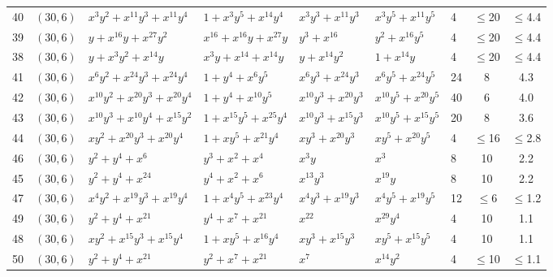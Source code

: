 \begin{table}[t]
\begin{tabular*}{\textwidth}{@{\extracolsep{\fill}}cllllllcc}
40 & $(30,6)$ & $x^{3}y^{2}{+}x^{11}y^{3}{+}x^{11}y^{4}$ & $1{+}x^{3}y^{5}{+}x^{14}y^{4}$ & $x^{3}y^{3}{+}x^{11}y^{3}$ & $x^{3}y^{5}{+}x^{11}y^{5}$ & 4 & $\leq$20 & $\leq$4.4 \\
39 & $(30,6)$ & $y{+}x^{16}y{+}x^{27}y^{2}$ & $x^{16}{+}x^{16}y{+}x^{27}y$ & $y^{3}{+}x^{16}$ & $y^{2}{+}x^{16}y^{5}$ & 4 & $\leq$20 & $\leq$4.4 \\
38 & $(30,6)$ & $y{+}x^{3}y^{2}{+}x^{14}y$ & $x^{3}y{+}x^{14}{+}x^{14}y$ & $y{+}x^{14}y^{2}$ & $1{+}x^{14}y$ & 4 & $\leq$20 & $\leq$4.4 \\
41 & $(30,6)$ & $x^{6}y^{2}{+}x^{24}y^{3}{+}x^{24}y^{4}$ & $1{+}y^{4}{+}x^{6}y^{5}$ & $x^{6}y^{3}{+}x^{24}y^{3}$ & $x^{6}y^{5}{+}x^{24}y^{5}$ & 24 & 8 & 4.3 \\
42 & $(30,6)$ & $x^{10}y^{2}{+}x^{20}y^{3}{+}x^{20}y^{4}$ & $1{+}y^{4}{+}x^{10}y^{5}$ & $x^{10}y^{3}{+}x^{20}y^{3}$ & $x^{10}y^{5}{+}x^{20}y^{5}$ & 40 & 6 & 4.0 \\
43 & $(30,6)$ & $x^{10}y^{3}{+}x^{10}y^{4}{+}x^{15}y^{2}$ & $1{+}x^{15}y^{5}{+}x^{25}y^{4}$ & $x^{10}y^{3}{+}x^{15}y^{3}$ & $x^{10}y^{5}{+}x^{15}y^{5}$ & 20 & 8 & 3.6 \\
44 & $(30,6)$ & $xy^{2}{+}x^{20}y^{3}{+}x^{20}y^{4}$ & $1{+}xy^{5}{+}x^{21}y^{4}$ & $xy^{3}{+}x^{20}y^{3}$ & $xy^{5}{+}x^{20}y^{5}$ & 4 & $\leq$16 & $\leq$2.8 \\
46 & $(30,6)$ & $y^{2}{+}y^{4}{+}x^{6}$ & $y^{3}{+}x^{2}{+}x^{4}$ & $x^{3}y$ & $x^{3}$ & 8 & 10 & 2.2 \\
45 & $(30,6)$ & $y^{2}{+}y^{4}{+}x^{24}$ & $y^{4}{+}x^{2}{+}x^{6}$ & $x^{13}y^{3}$ & $x^{19}y$ & 8 & 10 & 2.2 \\
47 & $(30,6)$ & $x^{4}y^{2}{+}x^{19}y^{3}{+}x^{19}y^{4}$ & $1{+}x^{4}y^{5}{+}x^{23}y^{4}$ & $x^{4}y^{3}{+}x^{19}y^{3}$ & $x^{4}y^{5}{+}x^{19}y^{5}$ & 12 & $\leq$6 & $\leq$1.2 \\
49 & $(30,6)$ & $y^{2}{+}y^{4}{+}x^{21}$ & $y^{4}{+}x^{7}{+}x^{21}$ & $x^{22}$ & $x^{29}y^{4}$ & 4 & 10 & 1.1 \\
48 & $(30,6)$ & $xy^{2}{+}x^{15}y^{3}{+}x^{15}y^{4}$ & $1{+}xy^{5}{+}x^{16}y^{4}$ & $xy^{3}{+}x^{15}y^{3}$ & $xy^{5}{+}x^{15}y^{5}$ & 4 & 10 & 1.1 \\
50 & $(30,6)$ & $y^{2}{+}y^{4}{+}x^{21}$ & $y^{2}{+}x^{7}{+}x^{21}$ & $x^{7}$ & $x^{14}y^{2}$ & 4 & $\leq$10 & $\leq$1.1 \\
\bottomrule
\end{tabular*}
\end{table}

